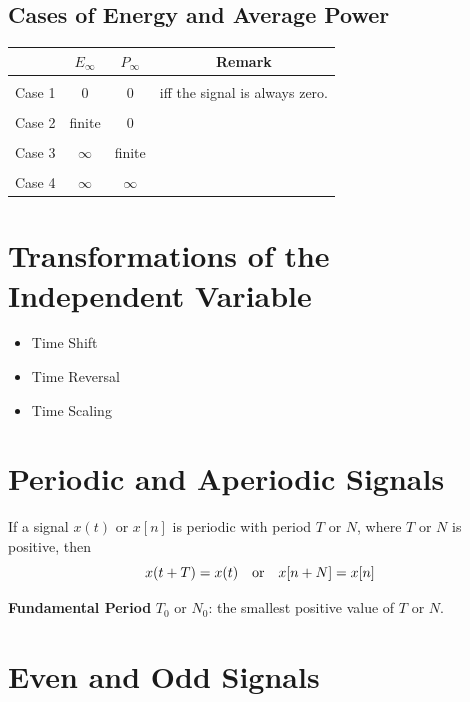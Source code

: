 \documentclass[10pt,UTF8]{article}
\newenvironment{definition box}
{\begin{tcolorbox}[colback=blue!5!white,colframe=blue!75!black,parbox=false,before upper=\par,before lower=\par]}
{\end{tcolorbox}}
\theoremstyle{definition}
\newtheorem*{definition inner}{Definition}
\theoremstyle{remark}
\begin{document}
\subsection{Cases of Energy and Average Power}
\begin{center}
\begin{tabular}
    { c @{\qquad}|@{\qquad\qquad} c @{\qquad\qquad\qquad} c @{\qquad\qquad\qquad} c }
     & $E_{\infty}$ & $P_{\infty}$ & Remark \\\hline\\
    Case 1 & $0$ & $0$ & iff the signal is always zero. \\\\
    Case 2 & finite & $0$ \\\\
    Case 3 & $\infty$ & finite \\\\
    Case 4 & $\infty$ & $\infty$    
\end{tabular}
\end{center}



\section{Transformations of the Independent Variable}

\begin{itemize}
    \item Time Shift
    \item Time Reversal
    \item Time Scaling
\end{itemize}


\section{Periodic and Aperiodic Signals}

If a signal $x(t)$ or $x[n]$ is periodic with period $T$ or $N$,
where $T$ or $N$ is positive, then
\begin{equation*}
    x(t+T) = x(t) \qor x[n+N] = x[n]
\end{equation*}

\textbf{Fundamental Period} $T_0$ or $N_0$:
the smallest positive value of $T$ or $N$.


\section{Even and Odd Signals}
\end{document}
